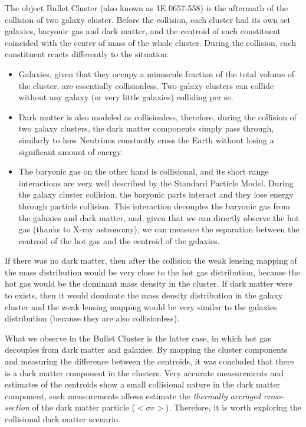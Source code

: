 The object Bullet Cluster (also known as 1E 0657-558) is the aftermath of the collision of two galaxy cluster.
Before the collision, each cluster had its own set galaxies, baryonic gas and dark matter, and the centroid of each constituent coincided with the center of mass of the whole cluster.
During the collision, each constituent reacts differently to the situation:
\begin{itemize}
\item Galaxies, given that they occupy a minuscule fraction of the total volume of the cluster, are essentially collisionless. Two galaxy clusters can collide without any galaxy (or very little galaxies) colliding per se. 
\item Dark matter is also modeled as collisionless, therefore, during the collision of two galaxy clusters, the dark matter components simply pass through, similarly to how Neutrinos constantly cross the Earth without losing a significant amount of energy.
\item The baryonic gas on the other hand is collisional, and its short range interactions are very well described by the Standard Particle Model. During the galaxy cluster collision, the baryonic parts interact and they lose energy through particle collision. This interaction decouples the baryonic gas from the galaxies and dark matter, and, given that we can directly observe the hot gas (thanks to X-ray astronomy), we can measure the separation between the centroid of the hot gas and the centroid of the galaxies.
\end{itemize}

If there was no dark matter, then after the collision the weak lensing mapping of the mass distribution would be very close to the hot gas distribution, because the hot gas would be the dominant mass density in the cluster. If dark matter were to exists, then it would dominate the mass density distribution in the galaxy cluster and the weak lensing mapping would be very similar to the galaxies distribution (because they are also collisionless).

What we observe in the Bullet Cluster is the latter case, in which hot gas decouples from dark matter and galaxies.
By mapping the cluster components and measuring the difference between the centroids, it was concluded that there is a dark matter component in the clusters.
Very accurate measurements and estimates of the centroids show a small collisional nature in the dark matter component, such measurements allows estimate the \emph{thermally averaged cross-section} of the dark matter particle ($<\sigma v>$).
Therefore, it is worth exploring the collisional dark matter scenario.

